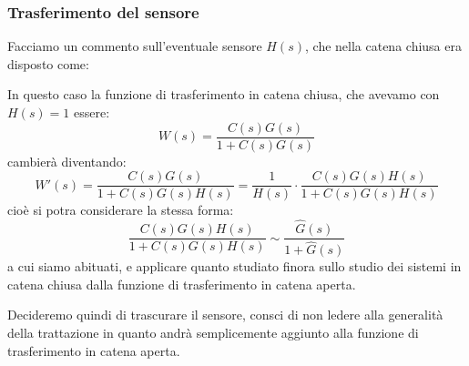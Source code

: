 \documentclass[a4paper,11pt]{article}
\begin{document}
\subsubsection{Trasferimento del sensore}
Facciamo un commento sull'eventuale sensore $H(s)$, che nella catena chiusa era disposto come:

\begin{center}
\end{center}

In questo caso la funzione di trasferimento in catena chiusa, che avevamo con $H(s) = 1$ essere:
$$
W(s) = \frac{C(s) G(s)}{1 + C(s) G(s)}
$$
cambierà diventando:
$$
W'(s) = \frac{C(s) G(s)}{1 + C(s) G(s) H(s)} = \frac{1}{H(s)} \cdot \frac{C(s) G(s) H(s)}{1 + C(s) G(s) H(s)}
$$
cioè si potra considerare la stessa forma:
$$
\frac{C(s) G(s) H(s)}{1 + C(s) G(s) H(s)} \sim \frac{\hat{G}(s)}{1 + \hat{G}(s)}
$$
a cui siamo abituati, e applicare quanto studiato finora sullo studio dei sistemi in catena chiusa dalla funzione di trasferimento in catena aperta.

Decideremo quindi di trascurare il sensore, consci di non ledere alla generalità della trattazione in quanto andrà semplicemente aggiunto alla funzione di trasferimento in catena aperta.
\end{document}
